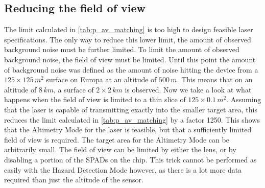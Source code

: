 \subsection{Reducing the field of view}
The limit calculated in \cref{tab:p_av_matching} is too high to design feasible laser specifications. The only way to reduce this lower limit, the amount of observed background noise must be further limited. To limit the amount of observed background noise, the field of view must be limited. Until this point the amount of background noise was defined as the amount of noise hitting the device from a $125\times125\,m^2$ surface on Europa at an altitude of $500\,m$. This means that on an altitude of $8\,km$, a surface of $2\times2\,km$ is observed. Now we take a look at what happens when the field of view is limited to a thin slice of $125\times0.1\,m^2$. Assuming that the laser is capable of transmitting exactly into the smaller target area, this reduces the limit calculated in \cref{tab:p_av_matching} by a factor 1250. This shows that the Altimetry Mode for the laser is feasible, but that a sufficiently limited field of view is required. The target area for the Altimetry Mode can be arbitrarily small. The field of view can be limited by either the lens, or by disabling a portion of the SPADs on the chip. This trick cannot be performed as easily with the Hazard Detection Mode however, as there is a lot more data required than just the altitude of the sensor. 
